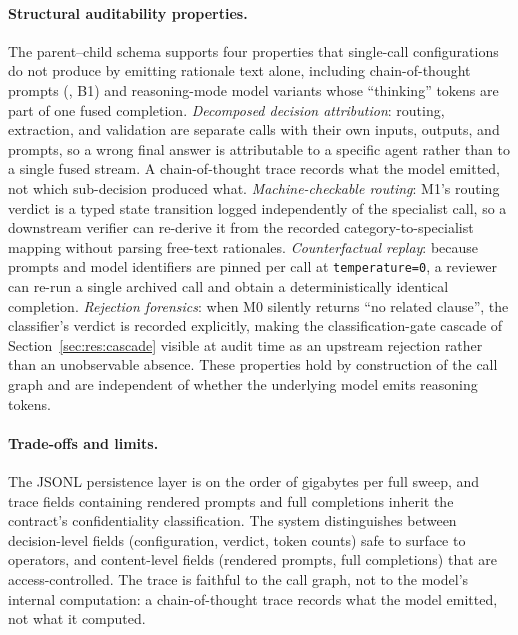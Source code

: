 \paragraph{Structural auditability properties.}\label{sec:sys:trace-properties}
The parent--child schema supports four properties that single-call configurations
do not produce by emitting rationale text alone, including chain-of-thought prompts
(\cfgCoT, B1) and reasoning-mode model variants whose ``thinking'' tokens are part
of one fused completion. \emph{Decomposed decision attribution}: routing,
extraction, and validation are separate calls with their own inputs, outputs,
and prompts, so a wrong final answer is attributable to a specific agent rather
than to a single fused stream. A chain-of-thought trace records what the model
emitted, not which sub-decision produced what. \emph{Machine-checkable routing}:
M1's routing verdict is a typed state transition logged independently of the
specialist call, so a downstream verifier can re-derive it from the recorded
category-to-specialist mapping without parsing free-text rationales.
\emph{Counterfactual replay}: because prompts and model identifiers are pinned
per call at \texttt{temperature=0}, a reviewer can re-run a single archived call
and obtain a deterministically identical completion. \emph{Rejection forensics}:
when M0 silently returns ``no related clause'', the classifier's verdict is
recorded explicitly, making the classification-gate cascade of
Section~\ref{sec:res:cascade} visible at audit time as an upstream rejection
rather than an unobservable absence. These properties hold by construction of
the call graph and are independent of whether the underlying model emits
reasoning tokens.

\paragraph{Trade-offs and limits.}
The JSONL persistence layer is on the order of gigabytes per full sweep, and trace
fields containing rendered prompts and full completions inherit the contract's
confidentiality classification. The system distinguishes between decision-level fields
(configuration, verdict, token counts) safe to surface to operators, and
content-level fields (rendered prompts, full completions) that are access-controlled.
The trace is faithful to the call graph, not to the model's internal computation:
a chain-of-thought trace records what the model emitted, not what it computed.

